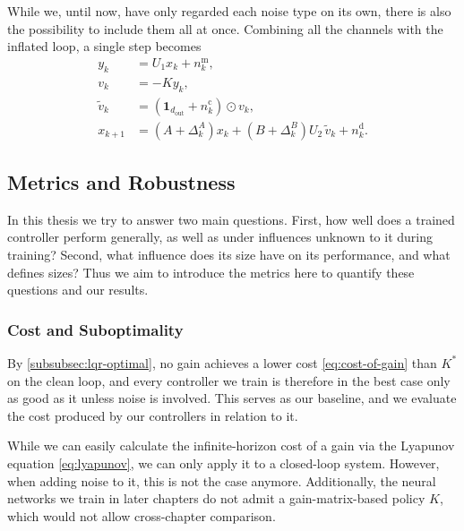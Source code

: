 While we, until now, have only regarded each noise type on its own,
there is also the possibility to include them all at once. Combining all the channels
with the inflated loop, a single step becomes
\begin{subequations}
\label{eq:noisy-loop}
\begin{align}
    y_k         &= U_1 x_k + n^{\mathrm{m}}_k , \label{eq:noisy-obs}\\
    v_k         &= -K y_k , \label{eq:noisy-ctrl}\\
    \tilde{v}_k &= \left( \mathbf{1}_{d_{\mathrm{out}}} + n^{\mathrm{c}}_k \right) \odot v_k , \label{eq:noisy-act}\\
    x_{k+1}     &= \left( A + \Delta_k^{A} \right) x_k + \left( B + \Delta_k^{B} \right) U_2\, \tilde{v}_k + n^{\mathrm{d}}_k . \label{eq:noisy-dyn}
\end{align}
\end{subequations}


\subsection{Metrics and Robustness}
\label{subsec:robustness}

In this thesis we try to answer two main questions. First, how well
does a trained controller perform generally, as well as under influences
unknown to it during training? Second, what influence does its size
have on its performance, and what defines sizes? Thus we aim to introduce
the metrics here to quantify these questions and our results.

\subsubsection{Cost and Suboptimality}
\label{subsubsec:suboptimality}

By \cref{subsubsec:lqr-optimal}, no gain achieves a
lower cost \eqref{eq:cost-of-gain} than $K^{*}$ on the clean loop,
and every controller we train is therefore in the best case only as good as it
unless noise is involved.
This serves as our baseline, and we evaluate the cost produced by our controllers
in relation to it.

While we can easily calculate the infinite-horizon cost of a gain
via the Lyapunov equation \eqref{eq:lyapunov}, we can only apply it
to a closed-loop system. However, when adding noise to it,
this is not the case anymore. Additionally, the neural
networks we train in later chapters do not admit a gain-matrix-based
policy $K$, which would not allow cross-chapter comparison.


